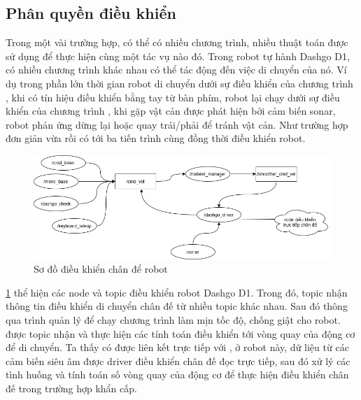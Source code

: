 \subsection{Phân quyền điều khiển}
Trong một vài trường hợp, có thể có nhiều chương trình, nhiều thuật toán được sử dụng để thực hiện cùng một tác vụ nào đó. Trong robot tự hành Dashgo D1, có nhiều chương trình khác nhau có thể tác động đến việc di chuyển của nó. Ví dụ trong phần lớn thời gian robot di chuyển dưới sự điều khiển của chương trình , khi có tín hiệu điều khiển bằng tay từ bàn phím, robot lại chạy dưới sự điều khiển của chương trình , khi gặp vật cản được phát hiện bởi cảm biến sonar, robot phản ứng dừng lại hoặc quay trái/phải để tránh vật cản. Như trường hợp đơn giản vừa rồi có tới ba tiến trình cùng đồng thời điều khiển robot.

\begin{figure}[htbp]
    \centering
    \includegraphics[width=\linewidth]{figures/phanquyen-goc.png}
    \caption{Sơ đồ điều khiển chân để robot}
    \label{fig:phanquyen-goc}
\end{figure}

\figurename{ \ref{fig:phanquyen-goc}} thể hiện các node và topic điều khiển robot Dashgo D1. Trong đó, topic  nhận thông tin điều khiển di chuyển chân đế từ nhiều topic khác nhau. Sau đó thông qua trình quản lý  để chạy chương trình làm mịn tốc độ, chống giật cho robot.  được topic  nhận và thực hiện các tính toán điều khiển tới vòng quay của động cơ để di chuyển.
Ta thấy có  được liên kết trực tiếp với , ở robot này, dữ liệu từ các cảm biến siêu âm được driver điều khiển chân đế đọc trực tiếp, sau đó xử lý các tình huống và tính toán số vòng quay của động cơ để thực hiện điều khiển chân đế trong trường hợp khẩn cấp.



